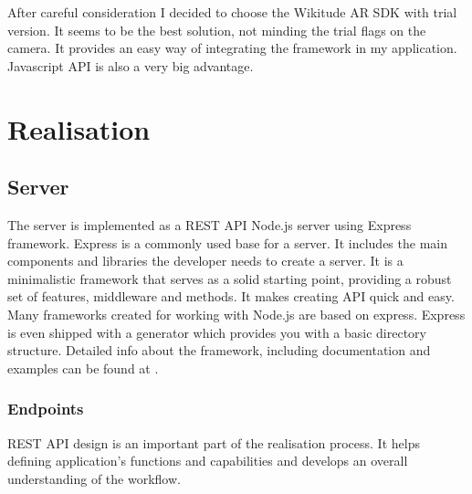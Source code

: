 \documentclass[thesis=M,english]{FITthesis}[2012/10/20]
\begin{document}
After careful consideration I decided to choose the Wikitude AR SDK with trial version. It seems to be the best solution, not minding the trial flags on the camera. It provides an easy way of integrating the framework in my application. Javascript API is also a very big advantage.



\chapter{Realisation}

\section{Server}


The server is implemented as a REST API Node.js server using Express framework. Express is a commonly used base for a server. It includes the main components and libraries the developer needs to create a server. It is a minimalistic framework that serves as a solid starting point, providing a robust set of features, middleware and methods. It makes creating API quick and easy. Many frameworks created for working with Node.js are based on express. Express is even shipped with a generator which provides you with a basic directory structure. Detailed info about the framework, including documentation and examples can be found at \cite{express}. 
\subsection{Endpoints}
REST API design is an important part of the realisation process. It helps defining application's functions and capabilities and develops an overall understanding of the workflow.
\end{document}
